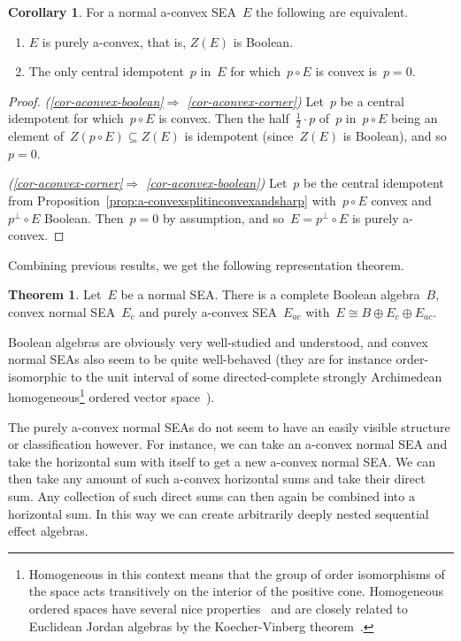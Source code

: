 \documentclass[a4paper, onecolumn, accepted=2020-12-22]{quantumarticle}
\newcommand{\mult}{\mathop{\circ}}
\newcounter{counter}
\theoremstyle{definition}
\newtheorem{theorem}[counter]{Theorem}
\newtheorem{corollary}[counter]{Corollary}
\begin{document}
\begin{corollary}
\label{cor-aconvex}
For a normal a-convex SEA~$E$ the following are equivalent.
\begin{enumerate}
\item
  \label{cor-aconvex-boolean}
    $E$ is purely a-convex,
    that is,
  $Z(E)$ is Boolean.
\item
  \label{cor-aconvex-corner}
The only central idempotent~$p$ in~$E$
for which~$p\mult E$ is convex is~$p=0$.
\end{enumerate}
\end{corollary}
\begin{proof}
\emph{(\ref{cor-aconvex-boolean}$\Rightarrow$%
\ref{cor-aconvex-corner})}
Let~$p$ be a central idempotent for which~$p\mult E$ is convex.
Then the half~$\frac{1}{2}\cdot p$ of~$p$
in~$p\mult E$
  being an element of~$Z(p\mult E)\subseteq Z(E)$
  is idempotent (since~$Z(E)$ is Boolean),
  and so~$p=0$.

\emph{(\ref{cor-aconvex-corner}$\Rightarrow$%
\ref{cor-aconvex-boolean})}
Let~$p$ be the central idempotent from 
Proposition~\ref{prop:a-convexsplitinconvexandsharp}
with~$p\mult E$ convex and~$p^\perp\mult E$ Boolean.
Then~$p=0$ by assumption,
and so~$E=p^\perp\mult E$ is purely a-convex.
\end{proof}


Combining previous results, we get the following representation theorem.
\begin{theorem}\label{thm:maintheorem}
Let~$E$ be a normal SEA.
There is a complete Boolean algebra~$B$,
    convex normal SEA~$E_c$
    and purely a-convex SEA~$E_{ac}$
    with~$E \cong B \oplus E_c \oplus E_{ac}$.
\end{theorem}
Boolean algebras are obviously very well-studied and understood,
and convex normal SEAs also seem to be quite well-behaved (they are for instance order-isomorphic to the unit interval
    of some directed-complete strongly Archimedean homogeneous\footnote{
    Homogeneous in this context means that the group of order isomorphisms of the space acts transitively on the interior of the positive cone. Homogeneous ordered spaces have several nice properties~\cite{vinberg1967theory} and are closely related to Euclidean Jordan algebras by the Koecher-Vinberg theorem~\cite{koecher1957positivitatsbereiche}.
    }
    ordered vector space~\cite{wetering2018characterisation}).

The purely a-convex normal SEAs do not seem to have an easily visible structure or classification however.
For instance, we can take an a-convex normal SEA and 
take the horizontal sum with itself to get a new a-convex normal SEA. 
We can then take any amount of such a-convex horizontal sums 
and take their direct sum. Any collection of such direct sums can then
again be combined into a horizontal sum. In this way we can create 
arbitrarily deeply nested sequential effect algebras.
\end{document}
